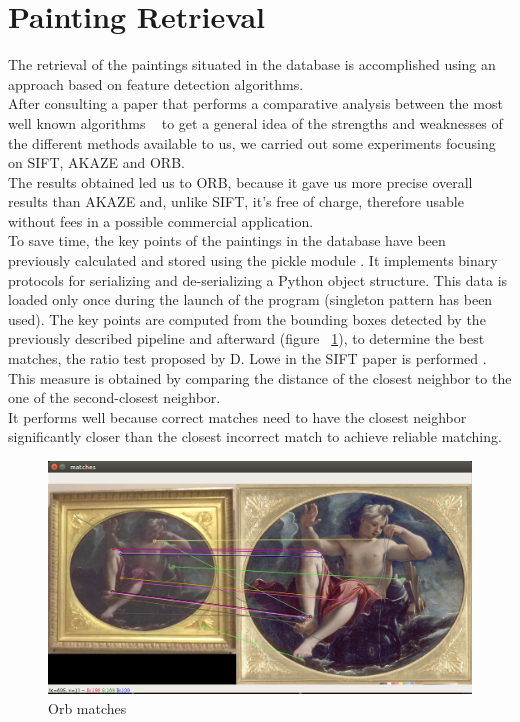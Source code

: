 \documentclass[conference]{IEEEtran}
\begin{document}
\section{Painting Retrieval}
The retrieval of the paintings situated in the database is accomplished using an approach based on feature detection algorithms.\\ 
After consulting a paper that performs a comparative analysis between the most well known algorithms ~\cite{b7} to get a general idea of the strengths and weaknesses of the different methods available to us, we carried out some experiments focusing on SIFT, AKAZE and ORB.\\
The results obtained led us to ORB, because it gave us more precise overall results than AKAZE and, unlike SIFT, it’s free of charge, therefore usable without fees in a possible commercial application.\\
To save time, the key points of the paintings in the database have been previously calculated and stored using the pickle module \cite{b8}.
It implements binary protocols for serializing and de-serializing a Python object structure.
This data is loaded only once during the launch of the program (singleton pattern has been used).
The key points are computed from the bounding boxes detected by the previously described pipeline and afterward (figure ~\ref{fig_Orb_matches}), to determine the best matches, the ratio test proposed by D. Lowe in the SIFT paper is performed \cite{b9}.\\
This measure is obtained by comparing the distance of the closest neighbor to the one of the second-closest neighbor.\\
It performs well because correct matches need to have the closest neighbor significantly closer than the closest incorrect match to achieve reliable matching.\\

\begin{figure}[htbp]
\centerline{\includegraphics[width=0.8\columnwidth]{../Orb_matches/match3.png}}
\caption{Orb matches}
\label{fig_Orb_matches}
\end{figure}
\end{document}
